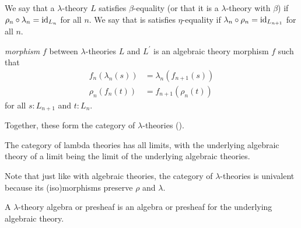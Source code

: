 \begin{definition}
  We say that a $ \lambda $-theory $ L $ satisfies $ \beta $-equality (or that it is a $ \lambda $-theory with $ \beta $) if $ \rho_n \circ \lambda_n = \text{id}_{L_n} $ for all $ n $. We say that is satisfies $ \eta $-equality if $ \lambda_n \circ \rho_n = \text{id}_{L_{n + 1}} $ for all $ n $.
\end{definition}

\begin{definition} \textit{morphism} $ f $ between $ \lambda $-theories $ L $ and $ L^\prime $ is an algebraic theory morphism $ f $ such that
  \begin{align*}
    f_n(\lambda_n(s)) &= \lambda_n(f_{n + 1}(s))\\
    \rho_n(f_n(t)) &= f_{n + 1}(\rho_n(t))
  \end{align*}
  for all $ s: L_{n + 1} $ and $ t: L_n $.
\end{definition}

Together, these form the category of $ \lambda $-theories \iindex{$ \LamTh $} ().

\begin{remark}
  The category of lambda theories has all limits, with the underlying algebraic theory of a limit being the limit of the underlying algebraic theories.
\end{remark}

\begin{remark}
  Note that just like with algebraic theories, the category of $ \lambda $-theories is univalent because its (iso)morphisms preserve $ \rho $ and $ \lambda $.
\end{remark}

\begin{definition}
  A $ \lambda $-theory algebra or presheaf is an algebra or presheaf for the underlying algebraic theory.
\end{definition}

